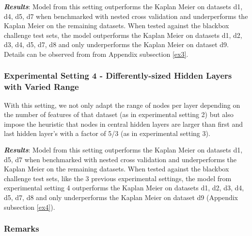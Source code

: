 \documentclass[
]{article}
\begin{document}
\textbf{\emph{Results}}: Model from this setting outperforms the Kaplan Meier on datasets d1, d4, d5, d7 when benchmarked with nested cross validation and underperforms the Kaplan Meier on the remaining datasets. When tested against the blackbox challenge test sets, the model outperforms the Kaplan Meier on datasets d1, d2, d3, d4, d5, d7, d8 and only underperforms the Kaplan Meier on dataset d9. Details can be observed from from Appendix subsection \ref{ex3}.

\hypertarget{experimental-setting-4---differently-sized-hidden-layers-with-varied-range}{%
\subsubsection{Experimental Setting 4 - Differently-sized Hidden Layers with Varied Range}\label{experimental-setting-4---differently-sized-hidden-layers-with-varied-range}}

With this setting, we not only adapt the range of nodes per layer depending on the number of features of that dataset (as in experimental setting 2) but also impose the heuristic that nodes in central hidden layers are larger than first and last hidden layer's with a factor of 5/3 (as in experimental setting 3).

\textbf{\emph{Results}}: Model from this setting outperforms the Kaplan Meier on datasets d1, d5, d7 when benchmarked with nested cross validation and underperforms the Kaplan Meier on the remaining datasets. When tested against the blackbox challenge test sets, like the 3 previous experimental settings, the model from experimental setting 4 outperforms the Kaplan Meier on datasets d1, d2, d3, d4, d5, d7, d8 and only underperforms the Kaplan Meier on dataset d9 (Appendix subsection \ref{ex4}).

\hypertarget{remarks}{%
\subsubsection{Remarks}\label{remarks}}
\end{document}
